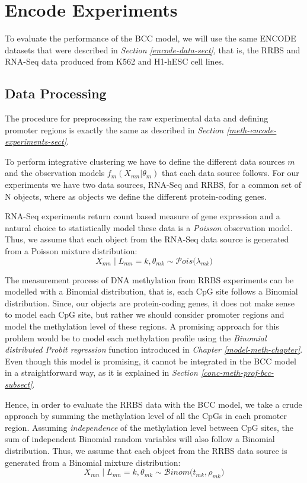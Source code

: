 \section{Encode Experiments} \label{integr-encode-exper-sect}
To evaluate the performance of the BCC model, we will use the same ENCODE datasets that were described in \emph{Section \ref{encode-data-sect}}, that is, the RRBS and RNA-Seq data produced from K562 and H1-hESC cell lines.

\subsection{Data Processing}
The procedure for preprocessing the raw experimental data and defining promoter regions is exactly the same as described in \emph{Section \ref{meth-encode-experiments-sect}}. 

To perform integrative clustering we have to define the different data sources $m$ and the observation models $f_{m}(X_{mn}|\theta_{m})$ that each data source follows. For our experiments we have two data sources, RNA-Seq and RRBS, for a common set of N objects, where as objects we define the different protein-coding genes.

RNA-Seq experiments return count based measure of gene expression and a natural choice to statistically model these data is a \emph{Poisson} observation model. Thus, we assume that each object from the RNA-Seq data source is generated from a Poisson mixture distribution:
\begin{equation}
	X_{mn} \mid L_{mn} = k, \theta_{mk} \sim \mathcal{P}ois\big(\lambda_{mk}\big)
\end{equation}

The measurement process of DNA methylation from RRBS experiments can be modelled with a Binomial distribution, that is, each CpG site follows a Binomial distribution. Since, our objects are protein-coding genes, it does not make sense to model each CpG site, but rather we should consider promoter regions and model the methylation level of these regions. A promising approach for this problem would be to model each methylation profile using the \emph{Binomial distributed Probit regression} function introduced in \emph{Chapter \ref{model-meth-chapter}}. Even though this model is promising, it cannot be integrated in the BCC model in a straightforward way, as it is  explained in \emph{Section \ref{conc-meth-prof-bcc-subsect}}.

Hence, in order to evaluate the RRBS data with the BCC model, we take a crude approach by summing the methylation level of all the CpGs in each promoter region. Assuming \emph{independence} of the methylation level between CpG sites, the sum of independent Binomial random variables will also follow a Binomial distribution. Thus, we assume that each object from the RRBS data source is generated from a Binomial mixture distribution:
\begin{equation}
	X_{mn} \mid L_{mn} = k, \theta_{mk} \sim \mathcal{B}inom\big(t_{mk}, \rho_{mk}\big)
\end{equation}

